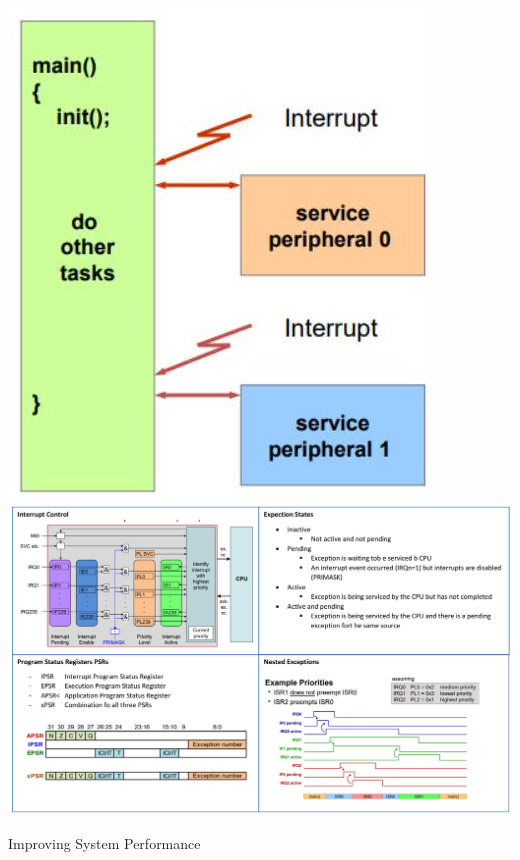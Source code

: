 \documentclass[10pt]{article}
\begin{document}
\begin{itemize}
\includegraphics[width=\linewidth]{images/2024_12_29_79e6b22f503fb7b4f718g-11(2)}\\
\includegraphics[width=\linewidth]{images/2024_12_29_79e6b22f503fb7b4f718g-12}
\end{itemize}

Improving System Performance
\end{document}
